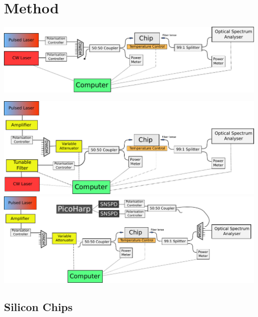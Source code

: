 \section{Method}
\begingroup
    \centering  
    \includegraphics[width=18cm]{img/method/setup_1.pdf}
     \vspace{3pt} \label{crossCompare}
\endgroup

\begingroup
    \centering  
    \includegraphics[width=18cm]{img/method/setup_2.pdf}
     \vspace{3pt} \label{crossCompare}
\endgroup
\begingroup
    \centering  
    \includegraphics[width=18cm]{img/method/setup_3.pdf}
     \vspace{3pt} \label{crossCompare}
\endgroup

\subsection{Silicon Chips}
